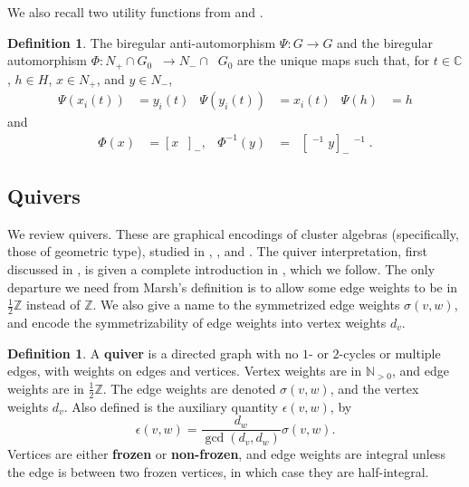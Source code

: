 \documentclass{amsart}
\theoremstyle{plain}
\theoremstyle{definition}
\newtheorem{definition}[theorem]{Definition}
\theoremstyle{remark}
\newcommand{\defined}[1]{\textbf{#1}}
\newcommand{\lifttoG}[1]{{\mathop{\overline{#1}}}}
\begin{document}
  We also recall two utility functions from \cite{fominzelevinsky1999}
  and \cite{fockgoncharov2006}.

  \begin{definition}
    \label{def:phi-and-psi}
    The biregular anti-automorphism $\Psi : G \to G$ and the biregular
    automorphism $\Phi : N_{+} \cap G_0 \lifttoG{w_0} \to N_{-} \cap
    \lifttoG{w_0} G_0$ are the unique maps such that, for $t \in
    \mathbb{C}$, $h \in H$, $x \in N_{+}$, and $y \in N_{-}$,
    \begin{align*}
      \Psi(x_i(t)) &= y_i(t) & \Psi(y_i(t)) &= x_i(t) & \Psi(h) &= h
    \end{align*}
    and
    \begin{align*}
      \Phi(x) &= [x \lifttoG{w_0}]_{-}, & \Phi^{-1}(y) &= \lifttoG{w_0} [\lifttoG{w_0}^{-1} y]_{-} \lifttoG{w_0}^{-1}.
    \end{align*}
  \end{definition}

  \label{sec:quivers-and-cluster-ensembles}

  \subsection{Quivers}

  \label{sec:quivers}

  We review quivers. These are graphical encodings of cluster algebras
  (specifically, those of geometric type), studied in
  \cite{fominzelevinsky2002}, \cite{fominzelevinsky2003}, and
  \cite{fominzelevinsky2005}. The quiver interpretation, first discussed
  in \cite{marshreinekezelevinsky2003}, is given a complete introduction
  in \cite{marsh2013}, which we follow. The only departure we need from
  Marsh's definition is to allow some edge weights to be in $\frac{1}{2}
  \mathbb{Z}$ instead of $\mathbb{Z}$. We also give a name to the
  symmetrized edge weights $\sigma(v,w)$, and encode the
  symmetrizability of edge weights into vertex weights $d_v$.

  \begin{definition}
    \label{def:quiver}
    A \defined{quiver} is a directed graph with no $1$- or $2$-cycles or
    multiple edges, with weights on edges and vertices. Vertex weights
    are in $\mathbb{N}_{>0}$, and edge weights are in
    $\frac{1}{2}\mathbb{Z}$. The edge weights are denoted $\sigma(v,w)$,
    and the vertex weights $d_v$. Also defined is the auxiliary quantity
    $\epsilon(v,w)$, by \[ \epsilon(v,w) = \frac{d_w}{\gcd(d_v,d_w)}
      \sigma(v,w). \] Vertices are either \defined{frozen} or
    \defined{non-frozen}, and edge weights are integral unless the edge
    is between two frozen vertices, in which case they are
    half-integral.
  \end{definition}
\end{document}
